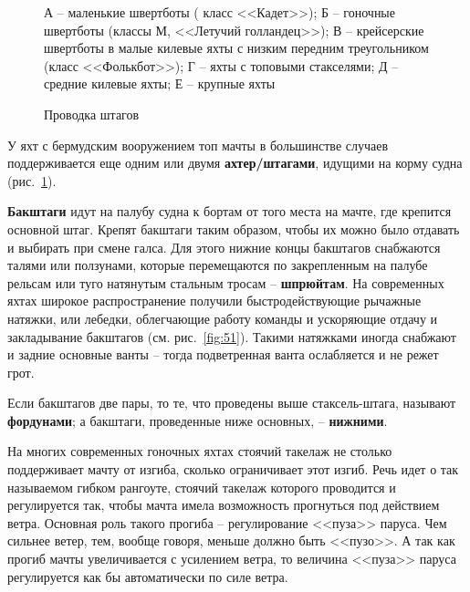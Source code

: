 \documentclass[a4paper, 12pt, twoside, final]{scrbook}
\begin{document}
\begin{figure}[htbp]
\begin{minipage}[b]{0.49\textwidth}
		\caption{Проводка штагов}
		\label{fig:39}
	\end{minipage}
	\par
	\smallskip
	\begin{minipage}[b]{0.49\textwidth}
		\centering\small
		А \--- маленькие швертботы ( класс <<Кадет>>); Б \--- гоночные швертботы (классы М, <<Летучий голландец>>); В \--- крейсерские швертботы в малые килевые яхты с низким передним треугольником (класс <<Фолькбот>>); Г \--- яхты с топовыми стакселями; Д \--- средние килевые яхты; Е \--- крупные яхты
	\end{minipage}
	\hfil\hfil%
	\begin{minipage}[b]{0.49\textwidth}
		\centering\small
		
	\end{minipage}
\end{figure}

У яхт с бермудским вооружением топ мачты в большинстве случаев поддерживается
еще одним или двумя \textbf{ахтер\-/штагами}, идущими на корму судна
(рис.~\ref{fig:39}).

\textbf{Бакштаги} идут на палубу судна к бортам от того места на мачте,
где крепится основной штаг. Крепят бакштаги таким образом, чтобы их
можно было отдавать и выбирать при смене галса. Для этого нижние концы
бакштагов снабжаются талями или ползунами, которые перемещаются по
закрепленным на палубе рельсам или туго натянутым стальным тросам
\--- \textbf{шпрюйтам}. На современных яхтах широкое распространение
получили быстродействующие рычажные натяжки, или лебедки, облегчающие
работу команды и ускоряющие отдачу и закладывание бакштагов (см. рис.~\ref{fig:51}).
Такими натяжками иногда снабжают и задние основные ванты \--- тогда подветренная
ванта ослабляется и не режет грот.

Если бакштагов две пары, то те, что проведены выше стаксель-штага,
называют \textbf{фордунами}; а бакштаги, проведенные ниже основных,
\--- \textbf{нижними}.

На многих современных гоночных яхтах стоячий такелаж не столько поддерживает
мачту от изгиба, сколько ограничивает этот изгиб. Речь идет о так
называемом гибком рангоуте, стоячий такелаж которого проводится и
регулируется так, чтобы мачта имела возможность прогнуться под действием
ветра. Основная роль такого прогиба \--- регулирование <<пуза>> паруса.
Чем сильнее ветер, тем, вообще говоря, меньше должно быть <<пузо>>.
А так как прогиб мачты увеличивается с усилением ветра, то величина
<<пуза>> паруса регулируется как бы автоматически по силе ветра.
\end{document}

